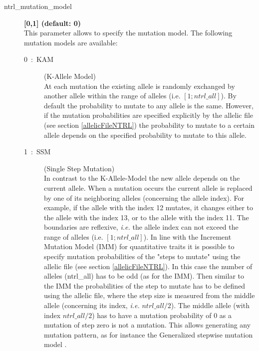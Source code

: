 \documentclass[letterpaper,12pt,oneside]{book}
\begin{document}
\begin{description}
\item[ntrl\_mutation\_model] \textbf{[0,1] (default: 0)}\\
This parameter allows to specify the mutation model. The following mutation models are available:
\begin{description}
\item[0~:~KAM] (K-Allele Model)\\
At each mutation the existing allele is randomly exchanged by another allele within the range of alleles (i.e. $[1; ntrl\_all]$). By default the probability to mutate to any allele is the same. However, if the mutation probabilities are specified explicitly by the allelic file (see section \ref{allelicFileNTRL}) the probability to mutate to a certain allele depends on the specified probability to mutate to this allele.

\item[1~:~SSM] (Single Step Mutation)\\
In contrast to the K-Allele-Model the new allele depends on the current allele. When a mutation occurs the current allele is replaced by one of its neighboring alleles (concerning the allele index). For example, if the allele with the index 12 mutates, it changes either to the allele with the index 13, or to the allele with the index 11. The boundaries are reflexive, \textit{i.e.} the allele index can not exceed the range of alleles (i.e. $[1; ntrl\_all]$). In line with the Increment Mutation Model (IMM) for quantitative traits it is possible to specify mutation probabilities of the "steps to mutate" using the allelic file (see section \ref{allelicFileNTRL}). In this case the number of alleles (\textsf{ntrl\_all}) has to be odd (as for the IMM). Then similar to the IMM the probabilities of the step to mutate has to be defined using the allelic file, where the step size is measured from the middle allele (concerning its index, \textit{i.e.} $ntrl\_all/2$). The middle allele (with index $ntrl\_all/2$) has to have a mutation probability of 0 as a mutation of step zero is not a mutation. This allows generating any mutation pattern, as for instance the Generalized stepwise mutation model \citep{Estoup_2002}.
\end{description}
\end{description}
\end{document}
